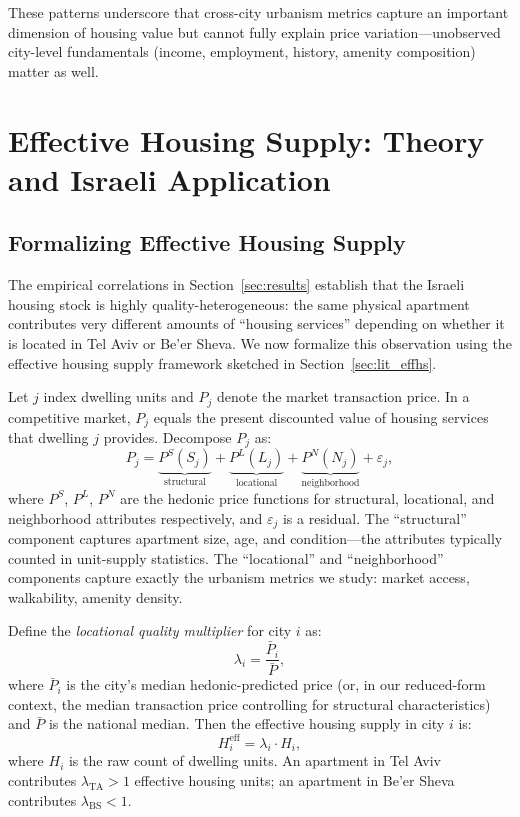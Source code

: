 \documentclass[12pt,a4paper]{article}
\begin{document}
These patterns underscore that cross-city urbanism metrics capture an important
dimension of housing value but cannot fully explain price variation—unobserved
city-level fundamentals (income, employment, history, amenity composition)
matter as well.

\section{Effective Housing Supply: Theory and Israeli Application}
\label{sec:theory}

\subsection{Formalizing Effective Housing Supply}
\label{sec:theory_formal}

The empirical correlations in Section~\ref{sec:results} establish that the
Israeli housing stock is highly quality-heterogeneous: the same physical
apartment contributes very different amounts of ``housing services'' depending on
whether it is located in Tel Aviv or Be'er Sheva.  We now formalize this
observation using the effective housing supply framework sketched in
Section~\ref{sec:lit_effhs}.

Let $j$ index dwelling units and $P_j$ denote the market transaction price.  In
a competitive market, $P_j$ equals the present discounted value of housing
services that dwelling $j$ provides.  Decompose $P_j$ as:
\begin{equation}
\label{eq:decomp}
  P_j = \underbrace{P^S(S_j)}_{\text{structural}}
      + \underbrace{P^L(L_j)}_{\text{locational}}
      + \underbrace{P^N(N_j)}_{\text{neighborhood}}
      + \varepsilon_j,
\end{equation}
where $P^S$, $P^L$, $P^N$ are the hedonic price functions for structural,
locational, and neighborhood attributes respectively, and $\varepsilon_j$ is a
residual.  The ``structural'' component captures apartment size, age, and
condition—the attributes typically counted in unit-supply statistics.  The
``locational'' and ``neighborhood'' components capture exactly the urbanism
metrics we study: market access, walkability, amenity density.

Define the \textit{locational quality multiplier} for city $i$ as:
\begin{equation}
\label{eq:lqm}
  \lambda_i = \frac{\bar{P}_i}{\bar{P}},
\end{equation}
where $\bar{P}_i$ is the city's median hedonic-predicted price (or, in our
reduced-form context, the median transaction price controlling for structural
characteristics) and $\bar{P}$ is the national median.  Then the effective
housing supply in city $i$ is:
\begin{equation}
\label{eq:ehs_city}
  H_i^{\text{eff}} = \lambda_i \cdot H_i,
\end{equation}
where $H_i$ is the raw count of dwelling units.  An apartment in Tel Aviv
contributes $\lambda_{\text{TA}} > 1$ effective housing units; an apartment in
Be'er Sheva contributes $\lambda_{\text{BS}} < 1$.
\end{document}
